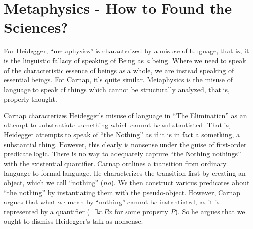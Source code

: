 \documentclass[leqno, 12pt]{turabian-researchpaper}
\begin{document}

	\section{Metaphysics - How to Found the Sciences?}

	For Heidegger, \enquote{metaphysics} is characterized by a misuse of language,
	that is, it is the linguistic fallacy of speaking of Being as \emph{a} being. Where
	we need to speak of the characteristic essence of beings as a whole, we are
	instead speaking of essential beings. For Carnap, it's quite similar. Metaphysics
	is the misuse of language to speak of things which cannot be structurally analyzed,
	that is, properly thought.

	Carnap characterizes Heidegger's misuse of language in \enquote{The Elimination}
	as an attempt to substantiate something which cannot be substantiated. That is,
	Heidegger attempts to speak of \enquote{the Nothing} as if it is in fact a something,
	a substantial thing. However, this clearly is nonsense under the guise of
	first-order predicate logic. There is no way to adequately capture \enquote{the Nothing nothings}
	with the existential quantifier. Carnap outlines a transition from ordinary language
	to formal language. He characterizes the transition first by creating an
	object, which we call \enquote{nothing} ($no$). We then construct various predicates
	about \enquote{the nothing} by instantiating them with the pseudo-object. However,
	Carnap argues that what we mean by \enquote{nothing} cannot be instantiated,
	as it is represented by a quantifier ($\neg\exists x.Px$ for some property $P$).
	So he argues that we ought to dismiss Heidegger's talk as nonsense.
\end{document}

